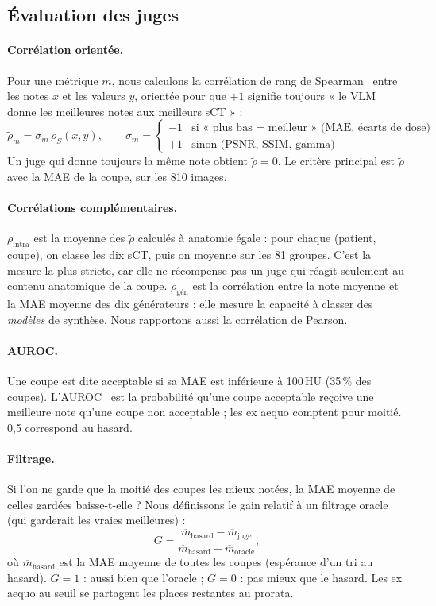 \documentclass[11pt,a4paper]{article}
\newcommand{\rhot}{\tilde{\rho}}
\begin{document}
\subsection{Évaluation des juges}
\label{sec:eval}
\paragraph{Corrélation orientée.} Pour une métrique $m$, nous calculons la corrélation de rang de Spearman~\cite{spearman1904} entre les notes $x$ et les valeurs $y$, orientée pour que $+1$ signifie toujours « le VLM donne les meilleures notes aux meilleurs sCT » :
\begin{equation}
\rhot_m = \sigma_m\,\rho_S(x, y),\qquad \sigma_m = \begin{cases}-1 & \text{si « plus bas = meilleur » (MAE, écarts de dose)}\\ +1 & \text{sinon (PSNR, SSIM, gamma)}\end{cases}
\end{equation}
Un juge qui donne toujours la même note obtient $\rhot = 0$. Le critère principal est $\rhot$ avec la MAE de la coupe, sur les 810 images.

\paragraph{Corrélations complémentaires.} $\rho_\text{intra}$ est la moyenne des $\rhot$ calculés à anatomie égale : pour chaque (patient, coupe), on classe les dix sCT, puis on moyenne sur les 81 groupes. C'est la mesure la plus stricte, car elle ne récompense pas un juge qui réagit seulement au contenu anatomique de la coupe. $\rho_\text{gén}$ est la corrélation entre la note moyenne et la MAE moyenne des dix générateurs : elle mesure la capacité à classer des \emph{modèles} de synthèse. Nous rapportons aussi la corrélation de Pearson.

\paragraph{AUROC.} Une coupe est dite acceptable si sa MAE est inférieure à 100\,HU (35\,\% des coupes). L'AUROC~\cite{hanley1982auc} est la probabilité qu'une coupe acceptable reçoive une meilleure note qu'une coupe non acceptable ; les ex aequo comptent pour moitié. 0,5 correspond au hasard.

\paragraph{Filtrage.} Si l'on ne garde que la moitié des coupes les mieux notées, la MAE moyenne de celles gardées baisse-t-elle ? Nous définissons le gain relatif à un filtrage oracle (qui garderait les vraies meilleures) :
\begin{equation}
G = \frac{\overline{m}_\text{hasard} - \overline{m}_\text{juge}}{\overline{m}_\text{hasard} - \overline{m}_\text{oracle}},
\end{equation}
où $\overline{m}_\text{hasard}$ est la MAE moyenne de toutes les coupes (espérance d'un tri au hasard). $G = 1$ : aussi bien que l'oracle ; $G = 0$ : pas mieux que le hasard. Les ex aequo au seuil se partagent les places restantes au prorata.
\end{document}
